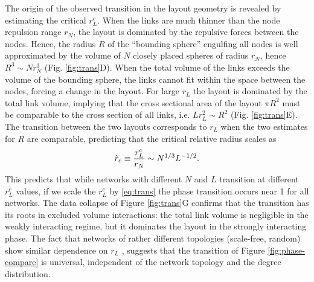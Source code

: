 \documentclass[nofootinbib,preprint,floatfix,titlepage,superscriptaddress]{revtex4} %
\begin{document}
The origin of the observed transition in the layout geometry is revealed by estimating the critical $r_L^c$.
When the links are much thinner than the node repulsion range  $r_N$, the layout is dominated by the repulsive forces between the nodes. 
Hence, the radius $R$ of the ``bounding sphere'' engulfing all nodes is well approximated by the volume of $N$ closely placed spheres of radius $r_N$, hence $ R^3 \sim Nr_N^3 $ (Fig. \ref{fig:trans}D). 
When the total volume of the links exceeds the volume of the bounding sphere, the links cannot fit within the space between the nodes, forcing a change in the layout.  
For large $r_L$ the layout is dominated by the total link volume, implying that the cross sectional area of the layout $\pi R^2$ must be comparable to the cross section of all links, i.e. $ L r_L^2 \sim R^2$ (Fig. \ref{fig:trans}E). 
The transition between the two layouts corresponds to   $r_L$ when the two estimates for $R$ are comparable, predicting that the critical relative radius  scales as
\begin{equation}
    \tilde{r}_c \equiv {r^c_L\over r_N} \sim N^{1/3} L^{-1/2}. \label{eq:trans}
\end{equation}
This predicts that while networks with different $N$ and $L$ transition at different $r_L^c$ values, if we scale the $r_L^c$ by \eqref{eq:trans} the phase transition occurs near 1 for all networks.
The data collapse of Figure \ref{fig:trans}G confirms that the transition has its roots in excluded volume interactions: the total link volume is negligible in the weakly interacting regime, but it dominates the layout in the strongly interacting phase.
The fact that networks of rather different topologies (scale-free, random) show similar dependence on $r_L$%
, suggests that the transition of Figure \ref{fig:phase-compare} is universal, independent of the network topology and the degree distribution. 
\end{document}
